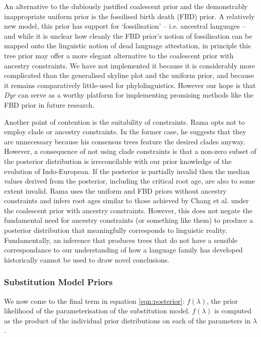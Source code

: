 \documentclass[10pt,journal,compsoc]{IEEEtran}
\begin{document}
An alternative to the dubiously justified coalescent prior and the demonstrably inappropriate uniform prior is the fossilised birth death (FBD) prior. A relatively new model, this prior has support for `fossilisation' -- i.e. ancestral languages -- and while it is unclear how cleanly the FBD prior's notion of fossilisation can be mapped onto the linguistic notion of dead language attestation, in principle this tree prior may offer a more elegant alternative to the coalescent prior with ancestry constraints. We have not implemented it because it is considerably more complicated than the generalised skyline plot and the uniform prior, and because it remains comparatively little-used for phylolinguistics. However our hope is that  \textit{Dyr} can serve as a worthy platform for implementing promising methods like the FBD prior in future research.

Another point of contention is the suitability of constraints. Rama opts not to employ clade or ancestry constraints. In the former case, he suggests that they are unnecessary because his consensus trees feature the desired clades anyway. However, a consequence of not using clade constraints is that a non-zero subset of the posterior distribution is irreconcilable with our prior knowledge of the evolution of Indo-European. If the posterior is partially invalid then the median values derived from the posterior, including the critical root age, are also to some extent invalid. Rama uses the uniform and FBD priors without ancestry constraints and infers root ages similar to those achieved by Chang et al. under the coalescent prior with ancestry constraints. However, this does not negate the fundamental need for ancestry constraints (or something like them) to produce a posterior distribution that meaningfully corresponds to linguistic reality. Fundamentally, an inference that produces trees that do not have a sensible correspondance to our understanding of how a language family has developed historically cannot be used to draw novel conclusions.

\subsubsection{Substitution Model Priors}

We now come to the final term in equation \eqref{eqn:posterior}: $f(\lambda)$, the prior likelihood of the parameterisation of the substitution model. $f(\lambda)$ is computed as the product of the individual prior distributions on each of the parameters in $\lambda$.
\end{document}
